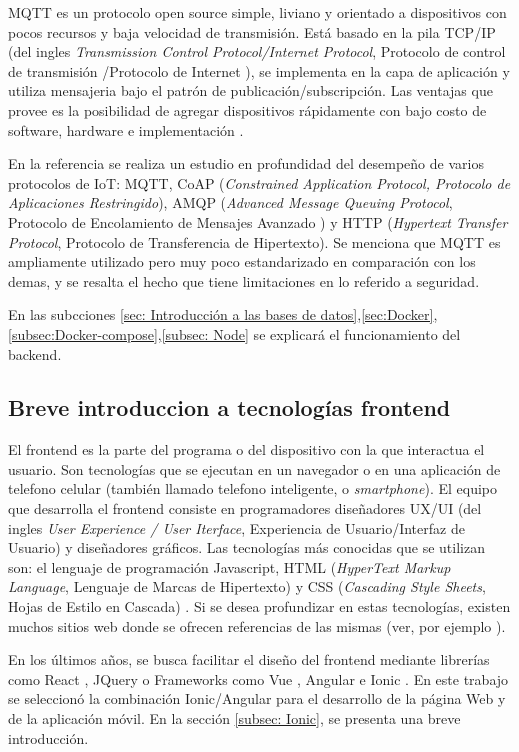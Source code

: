 MQTT es un protocolo open source simple, liviano y orientado a dispositivos con pocos recursos y baja velocidad de transmisión. Está basado en la pila TCP/IP (del ingles \textit{Transmission Control Protocol/Internet Protocol}, Protocolo de control de transmisión /Protocolo de Internet ), se implementa en la capa de aplicación y utiliza mensajeria bajo el patrón de publicación/subscripción. Las ventajas que provee es la posibilidad de agregar dispositivos rápidamente con bajo costo de software, hardware e implementación \citep{ARTICLE:2}.

En la referencia \citep{ARTICLE:2} se realiza un estudio en profundidad del desempeño de varios protocolos de IoT: MQTT, CoAP (\textit{Constrained Application Protocol, Protocolo de Aplicaciones Restringido}), AMQP  (\textit{Advanced Message Queuing Protocol}, Protocolo de Encolamiento de Mensajes Avanzado ) y HTTP (\textit{Hypertext Transfer Protocol}, Protocolo de Transferencia de Hipertexto). Se menciona que MQTT es ampliamente utilizado pero muy poco estandarizado en comparación con los demas, y se resalta el hecho que tiene limitaciones en lo referido a seguridad.

En las subcciones \ref{sec: Introducción a las bases de datos},\ref{sec:Docker},\ref{subsec:Docker-compose},\ref{subsec: Node} se explicará el funcionamiento del backend.
\subsection{Breve introduccion a tecnologías frontend}
\label{Breve introduccion a tecnologías frontend}
El frontend es la parte del programa o del dispositivo con la que interactua el usuario. Son tecnologías que se ejecutan en un navegador o en una aplicación de telefono celular (también llamado telefono inteligente, o \textit{smartphone}). El equipo que desarrolla el frontend consiste en programadores diseñadores UX/UI (del ingles \textit{User Experience / User Iterface}, Experiencia de Usuario/Interfaz de Usuario) y diseñadores gráficos. Las tecnologías más conocidas que se utilizan son: el lenguaje de programación Javascript, HTML (\textit{HyperText Markup Language}, Lenguaje de Marcas de Hipertexto) y CSS (\textit{Cascading Style Sheets}, Hojas de Estilo en Cascada) \citep{ARTICLE:4}. Si se desea profundizar en estas tecnologías, existen muchos sitios web donde se ofrecen referencias de las mismas (ver, por ejemplo \citep{WEBSITE:13}).  

En los últimos años, se busca facilitar el diseño del frontend mediante librerías como React \citep{WEBSITE:14},  JQuery \citep{WEBSITE:17} o Frameworks como Vue \citep{WEBSITE:15}, Angular \citep{WEBSITE:16} e Ionic \citep{WEBSITE:18}. En este trabajo se seleccionó la combinación Ionic/Angular para el desarrollo de la página Web y de la aplicación móvil. En la sección \ref{subsec: Ionic}, se presenta una breve introducción.

